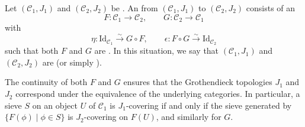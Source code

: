 \begin{definition} \label{definition:equivalence_of_sites}
Let $(\mathcal{C}_1, J_1)$ and $(\mathcal{C}_2, J_2)$ be . An  from $(\mathcal{C}_1, J_1)$ to $(\mathcal{C}_2, J_2)$ consists of an 
$$F: \mathcal{C}_1 \to \mathcal{C}_2, \qquad G: \mathcal{C}_2 \to \mathcal{C}_1$$
with 
$$\eta: \mathrm{Id}_{\mathcal{C}_1} \xrightarrow{\sim} G \circ F, \qquad \epsilon: F \circ G \xrightarrow{\sim} \mathrm{Id}_{\mathcal{C}_2}$$
such that both $F$ and $G$ are . In this situation, we say that $(\mathcal{C}_1, J_1)$ and $(\mathcal{C}_2, J_2)$ are  (or simply ).


\begin{remark}
    The continuity of both $F$ and $G$ ensures that the Grothendieck topologies $J_1$ and $J_2$ correspond under the equivalence of the underlying categories. In particular, a sieve $S$ on an object $U$ of $\mathcal{C}_1$ is $J_1$-covering if and only if the sieve generated by $\{F(\phi) \mid \phi \in S\}$ is $J_2$-covering on $F(U)$, and similarly for $G$.
\end{remark}
\end{definition}